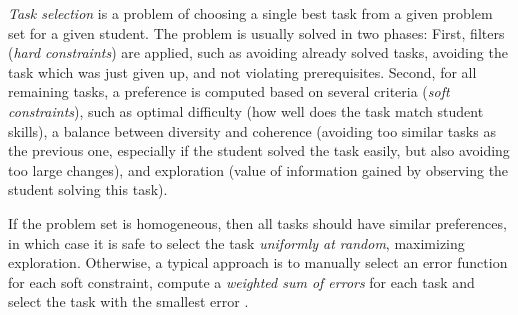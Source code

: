 \emph{Task selection} is a problem of choosing a single best task
from a given problem set for a given student.
The problem is usually solved in two phases:
First, filters (\emph{hard constraints}) are applied,
such as avoiding already solved
tasks, avoiding the task which was just given up, %
and not violating prerequisites.  %
Second, for all remaining tasks, a preference is computed based on several criteria
(\emph{soft constraints}), such as
optimal difficulty (how well does the task match student skills),
a balance between diversity and coherence
(avoiding too similar tasks as the previous one, especially if the student
solved the task easily, but also avoiding too large changes),
and exploration (value of information gained by observing the student solving this task).

If the problem set is homogeneous, then all tasks should have similar preferences,
in which case it is safe to select the task \emph{uniformly at random},
maximizing exploration.
Otherwise, a typical approach is to manually select an error function for each
soft constraint, compute a \emph{weighted sum of errors} for each task and
select the task with the smallest error \cite{alg.geography}.



